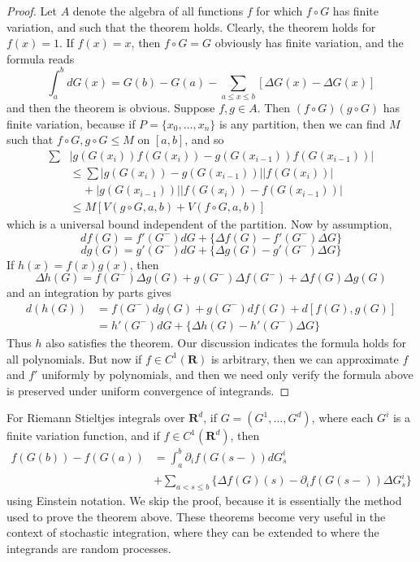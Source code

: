 \begin{proof}
    Let $A$ denote the algebra of all functions $f$ for which $f \circ G$ has finite variation, and such that the theorem holds. Clearly, the theorem holds for $f(x) = 1$. If $f(x) = x$, then $f \circ G = G$ obviously has finite variation, and the formula reads
    \[ \int_a^b dG(x) = G(b) - G(a) - \sum_{a \leq x \leq b} [\Delta G(x) - \Delta G(x)] \]
    and then the theorem is obvious. Suppose $f,g \in A$. Then $(f \circ G)(g \circ G)$ has finite variation, because if $P = \{ x_0, \dots, x_n \}$ is any partition, then we can find $M$ such that $f \circ G, g \circ G \leq M$ on $[a,b]$, and so
    \begin{align*}
        \sum & |g(G(x_i))f(G(x_i)) - g(G(x_{i-1}))f(G(x_{i-1}))|\\
        &\leq \sum |g(G(x_i)) - g(G(x_{i-1}))| |f(G(x_i))|\\
        &\ \ \ \ \ + |g(G(x_{i-1}))| |f(G(x_i)) - f(G(x_{i-1}))|\\
        &\leq M[V(g \circ G,a,b) + V(f \circ G,a,b)]
    \end{align*}
    which is a universal bound independent of the partition. Now by assumption,
    \[ df(G) = f'(G^-) dG + \{ \Delta f(G) - f'(G^-) \Delta G \} \]
    \[ dg(G) = g'(G^-) dG + \{ \Delta g(G) - g'(G^-) \Delta G \} \]
    If $h(x) = f(x)g(x)$, then
    \[ \Delta h(G) = f(G^-) \Delta g(G) + g(G^-) \Delta f(G^-) + \Delta f(G) \Delta g(G) \]
    and an integration by parts gives
    \begin{align*}
        d(h(G)) &= f(G^-) dg(G) + g(G^-) df(G) + d[f(G),g(G)]\\
        &= h'(G^-) dG + \{ \Delta h(G) - h'(G^-) \Delta G \}
    \end{align*}
    Thus $h$ also satisfies the theorem. Our discussion indicates the formula holds for all polynomials. But now if $f \in C^1(\mathbf{R})$ is arbitrary, then we can approximate $f$ and $f'$ uniformly by polynomials, and then we need only verify the formula above is preserved under uniform convergence of integrands.
\end{proof}

For Riemann Stieltjes integrals over $\mathbf{R}^d$, if $G = (G^1, \dots, G^d)$, where each $G^i$ is a finite variation function, and if $f \in C^1(\mathbf{R}^d)$, then
%
\begin{align*}
    f(G(b)) - f(G(a)) &= \int_a^b \partial_i f(G(s-)) dG^i_s\\
    &+ \sum_{a < s \leq b} \{ \Delta f(G) (s) - \partial_i f(G(s-)) \Delta G^i_s \}
\end{align*}
%
using Einstein notation. We skip the proof, because it is essentially the method used to prove the theorem above. These theorems become very useful in the context of stochastic integration, where they can be extended to where the integrands are random processes.











